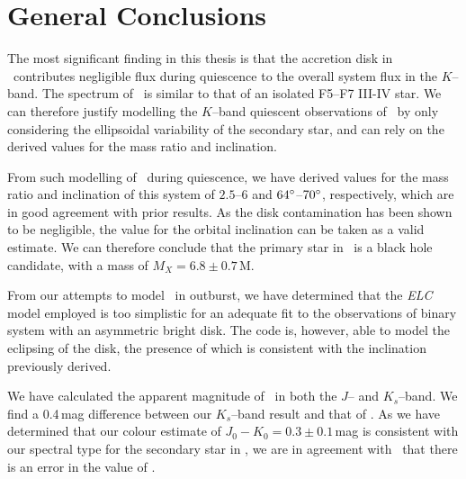 
\chapter{General Conclusions}\label{cha:GeneralConclusions}

The most significant finding in this thesis is that the accretion disk
in \\%
\groj\ contributes negligible flux during quiescence to the overall system flux in the $K$--band. The spectrum of \groj\ is similar to that of an
isolated F5--F7 III-IV star. We can therefore justify modelling
the $K$--band quiescent observations of \groj\ by only considering the ellipsoidal
variability of the secondary star, and can rely on the derived values
for the mass ratio and inclination. %

\vspace{\myparskip}

From such modelling of \groj\ during quiescence, we have derived
values for the mass ratio and inclination of this system of $2.5$--$6$
and $64\hbox{$^\circ$}$--$70\hbox{$^\circ$}$, respectively, which are in good agreement with
prior results. As the disk contamination has been shown to be
negligible, the value for the orbital inclination can be taken as a
valid estimate. We can therefore conclude that the primary star in
\groj\ is a black hole candidate, with a mass of $M_X =
6.8\pm0.7$\,M\sun. %

\vspace{\myparskip}

From our attempts to model \groj\ in outburst, we have determined that
the \textit{ELC} model employed is too simplistic for an adequate fit to
the observations of binary system with an asymmetric bright disk. The
code is, however, able to model the eclipsing of the disk, the
presence of which is consistent with the inclination previously
derived. %

\vspace{\myparskip}

We have calculated the apparent magnitude of \groj\ in both the $J$--
and $K_s$--band. We find a 0.4\,mag difference between our $K_s$--band
result and that of %
%
. As we have determined that our colour estimate of $J_{0} - K_{0} =
0.3\pm0.1$\,mag is consistent with our spectral type for the
secondary star in \groj, we are in agreement with %
%
\ that there is an error in the value of %
%
. %

